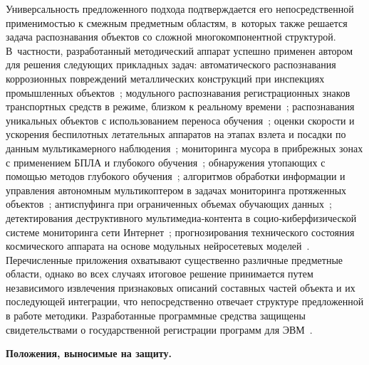 Универсальность предложенного подхода подтверждается его непосредственной
применимостью к смежным предметным областям, в~которых также решается
задача распознавания объектов со сложной многокомпонентной структурой.
В~частности, разработанный методический аппарат успешно применен автором
для решения следующих прикладных задач: автоматического распознавания
коррозионных повреждений металлических конструкций при инспекциях
промышленных
объектов~\cite{Rusakov2021corrosion}; модульного распознавания
регистрационных знаков транспортных средств в режиме, близком к реальному
времени~\cite{Rusakov2020license}; распознавания уникальных объектов с
использованием переноса обучения~\cite{Rusakov2020transfer}; оценки
скорости и ускорения беспилотных летательных аппаратов на этапах взлета и
посадки по данным мультикамерного наблюдения~\cite{Rusakov2023uavspeed};
мониторинга мусора в прибрежных зонах с применением БПЛА и глубокого
обучения~\cite{Rusakov2024marine}; обнаружения утопающих с помощью
методов глубокого
обучения~\cite{Rusakov2023drowning}; алгоритмов обработки информации и
управления автономным мультикоптером в задачах мониторинга протяженных
объектов~\cite{Rusakov2021multicopter}; антиспуфинга при ограниченных
объемах обучающих
данных~\cite{Rusakov2020antispoofing}; детектирования деструктивного
мультимедиа‑контента в социо‑киберфизической системе мониторинга сети
Интернет~\cite{Iskhakova2021destructive}; прогнозирования технического
состояния космического аппарата на основе модульных нейросетевых
моделей~\cite{Rusakov2017spacecraft}. Перечисленные приложения охватывают
существенно различные предметные области, однако во всех случаях
итоговое решение принимается путем независимого извлечения признаковых
описаний составных частей объекта и их последующей интеграции, что
непосредственно отвечает структуре предложенной в работе методики.
Разработанные программные средства защищены свидетельствами о
государственной регистрации программ для
ЭВМ~\cite{prog_reid_bayes,prog_detect_small}.

\textbf{Положения, выносимые на защиту.}

